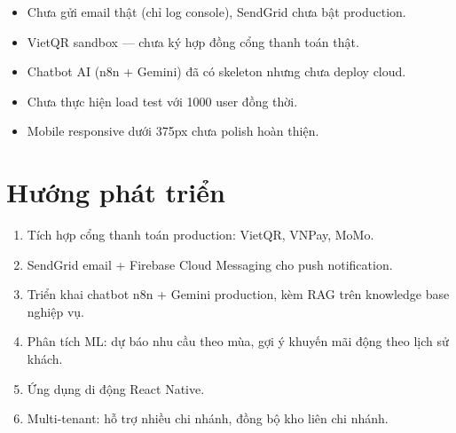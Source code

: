\begin{itemize}
  \item Chưa gửi email thật (chỉ log console), SendGrid chưa bật production.
  \item VietQR sandbox --- chưa ký hợp đồng cổng thanh toán thật.
  \item Chatbot AI (n8n + Gemini) đã có skeleton nhưng chưa deploy cloud.
  \item Chưa thực hiện load test với 1000 user đồng thời.
  \item Mobile responsive dưới 375px chưa polish hoàn thiện.
\end{itemize}

\section*{Hướng phát triển}

\begin{enumerate}
  \item Tích hợp cổng thanh toán production: VietQR, VNPay, MoMo.
  \item SendGrid email + Firebase Cloud Messaging cho push notification.
  \item Triển khai chatbot n8n + Gemini production, kèm RAG trên knowledge base nghiệp vụ.
  \item Phân tích ML: dự báo nhu cầu theo mùa, gợi ý khuyến mãi động theo lịch sử khách.
  \item Ứng dụng di động React Native.
  \item Multi-tenant: hỗ trợ nhiều chi nhánh, đồng bộ kho liên chi nhánh.
\end{enumerate}
